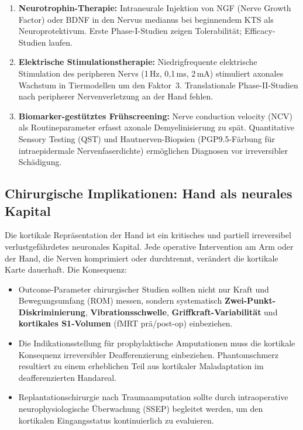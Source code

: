 ﻿\documentclass[12pt,a4paper]{report}
\theoremstyle{plain}
\theoremstyle{definition}
\theoremstyle{remark}
\begin{document}
\begin{enumerate}
\item \textbf{Neurotrophin-Therapie:} Intraneurale Injektion von NGF
  (Nerve Growth Factor) oder BDNF in den Nervus medianus bei beginnendem
  KTS als Neuroprotektivum. Erste Phase-I-Studien zeigen Tolerabilität;
  Efficacy-Studien laufen.
\item \textbf{Elektrische Stimulationstherapie:} Niedrigfrequente
  elektrische Stimulation des peripheren Nervs (1\,Hz, 0{,}1\,ms, 2\,mA)
  stimuliert axonales Wachstum in Tiermodellen um den Faktor~3.
  Translationale Phase-II-Studien nach peripherer Nervenverletzung
  an der Hand fehlen.
\item \textbf{Biomarker-gestütztes Frühscreening:} Nerve conduction
  velocity (NCV) als Routineparameter erfasst axonale Demyelinisierung
  zu spät. Quantitative Sensory Testing (QST) und Hautnerven-Biopsien
  (PGP9.5-Färbung für intraepidermale Nervenfaserdichte) ermöglichen
  Diagnosen vor irreversibler Schädigung.
\end{enumerate}

\subsection{Chirurgische Implikationen: Hand als neurales Kapital}

Die kortikale Repräsentation der Hand ist ein kritisches und partiell
irreversibel verlustgefährdetes neuronales Kapital. Jede operative
Intervention am Arm oder der Hand, die Nerven komprimiert oder
durchtrennt, verändert die kortikale Karte dauerhaft. Die Konsequenz:

\begin{itemize}
\item Outcome-Parameter chirurgischer Studien sollten nicht nur
  Kraft und Bewegungsumfang (ROM) messen, sondern systematisch
  \textbf{Zwei-Punkt-Diskriminierung}, \textbf{Vibrationsschwelle},
  \textbf{Griffkraft-Variabilität} und \textbf{kortikales S1-Volumen}
  (fMRT prä/post-op) einbeziehen.
\item Die Indikationsstellung für prophylaktische Amputationen muss
  die kortikale Konsequenz irreversibler Deafferenzierung einbeziehen.
  Phantomschmerz resultiert zu einem erheblichen Teil aus kortikaler
  Maladaptation im deafferenzierten Handareal.
\item Replantationschirurgie nach Traumaamputation sollte durch
  intraoperative neurophysiologische Überwachung (SSEP) begleitet
  werden, um den kortikalen Eingangsstatus kontinuierlich zu evaluieren.
\end{itemize}
\end{document}
